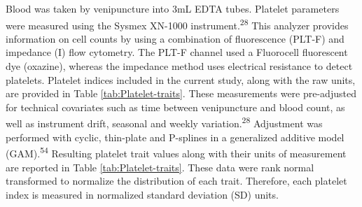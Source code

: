 \documentclass[11pt,twoside]{bristolthesis}
\begin{document}
Blood was taken by venipuncture into 3mL EDTA tubes. Platelet parameters were measured using the Sysmex XN-1000 instrument.\textsuperscript{28} This analyzer provides information on cell counts by using a combination of fluorescence (PLT-F) and impedance (I) flow cytometry. The PLT-F channel used a Fluorocell fluorescent dye (oxazine), whereas the impedance method uses electrical resistance to detect platelets. Platelet indices included in the current study, along with the raw units, are provided in Table \ref{tab:Platelet-traits}. These measurements were pre-adjusted for technical covariates such as time between venipuncture and blood count, as well as instrument drift, seasonal and weekly variation.\textsuperscript{28} Adjustment was performed with cyclic, thin-plate and P-splines in a generalized additive model (GAM).\textsuperscript{54} Resulting platelet trait values along with their units of measurement are reported in Table \ref{tab:Platelet-traits}. These data were rank normal transformed to normalize the distribution of each trait. Therefore, each platelet index is measured in normalized standard deviation (SD) units.
\end{document}
